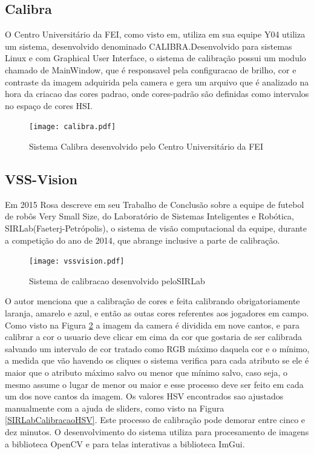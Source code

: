\subsection{Calibra}
O Centro Universitário da FEI, como visto em\cite{PenharbelTime}, utiliza em sua equipe Y04 utiliza um sistema, desenvolvido denominado CALIBRA\cite{Penharbel:2004}.Desenvolvido para sistemas Linux e com Graphical User Interface\cite{Penharbel:2004}, o sistema de calibração possui um modulo chamado de MainWindow, que é responsavel pela configuracao de brilho, cor e contraste da imagem adquirida pela camera e gera um arquivo que é analizado na hora da criacao das cores padrao\cite{PenharbelTime}, onde cores-padrão são definidas como intervalos no espaço de cores HSI\cite{PenharbelTime}.
\newpage
\begin{figure}[!h]
	\centering
	\texttt{[image: calibra.pdf]}
	\caption{Sistema Calibra desenvolvido pelo Centro Universitário da FEI \cite{Penharbel:2004}}
	\label{Calibra}
\end{figure}




\newpage
\subsection{VSS-Vision}

Em 2015 Rosa\cite{Rosa:2015} descreve em seu Trabalho de Conclusão sobre a equipe de futebol de rob\^os Very Small Size, do Laboratório de Sistemas Inteligentes e Robótica, SIRLab(Faeterj-Petrópolis), o sistema de visão computacional da equipe, durante a competição do ano de 2014, que abrange inclusive a parte de calibração. 

\begin{figure}[!h]
	\centering
	\texttt{[image: vssvision.pdf]} 	
	\caption{Sistema de calibracao desenvolvido peloSIRLab \cite{Rosa:2015}}
	\label{SIRLabCalibracao}
\end{figure}
O autor menciona que a calibração de cores e feita calibrando obrigatoriamente laranja, amarelo e azul, e então as outas cores referentes aos jogadores em campo. Como visto na Figura \ref{SIRLabCalibracao} a imagem da camera é dividida em nove cantos, e para calibrar a cor o usuario deve clicar em cima da cor que gostaria de ser calibrada salvando um intervalo de cor tratado como RGB máximo daquela cor e o mínimo, a medida
que vão havendo os cliques o sistema verifica para cada atributo se ele é maior que o atributo
máximo salvo ou menor que mínimo salvo, caso seja, o mesmo assume o lugar de menor ou
maior\cite{Rosa:2015} e esse processo deve ser feito em cada um dos nove cantos da imagem. Os valores HSV encontrados sao ajustados manualmente com a ajuda de sliders, como visto na Figura \ref{SIRLabCalibracaoHSV}. Este processo de calibração pode demorar entre cinco e dez minutos.
O desenvolvimento do sistema utiliza para procesamento de imagens a biblioteca OpenCV e para telas interativas a biblioteca  ImGui.

